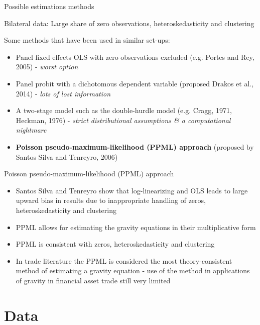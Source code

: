 \documentclass{beamer}
\begin{document}
\begin{frame}{Possible estimations methods}
\begin{block}{Bilateral data:}
Large share of zero observations, heteroskedasticity and clustering
\end{block}

\begin{block}{Some methods that have been used in similar set-ups:}
\begin{itemize}
\item Panel fixed effects OLS with zero observations excluded (e.g. Portes and Rey, 2005) - \textit{worst option}
\item Panel probit with a dichotomous dependent variable (proposed Drakos et al., 2014) - \textit{lots of lost information}
\item A two-stage model such as the double-hurdle model (e.g. Cragg, 1971, Heckman, 1976) - \textit{strict distributional assumptions \& a computational nightmare}
\item \textbf{Poisson pseudo-maximum-likelihood (PPML) approach} (proposed by Santos Silva and Tenreyro, 2006)
   \end{itemize}
\end{block}
\end{frame}

\begin{frame}{Poisson pseudo-maximum-likelihood (PPML) approach}
\begin{itemize}
\item Santos Silva and Tenreyro show that log-linearizing and OLS leads to large upward bias in results due to inappropriate handling of zeros, heteroskedasticity and clustering
\item PPML allows for estimating the gravity equations in their multiplicative form
\item PPML is consistent with zeros, heteroskedasticity and clustering
\item In trade literature the PPML is considered the most theory-consistent method of estimating a gravity equation - use of the method in applications of gravity in financial asset trade still very limited 
\end{itemize}
\end{frame}

\section{Data}
\end{document}
